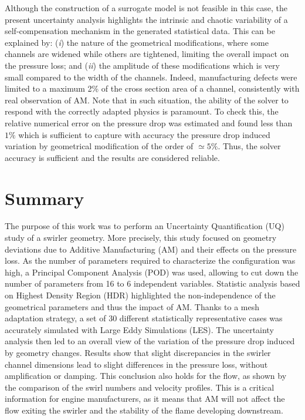 Although the construction of a surrogate model is not feasible in this case, the present uncertainty analysis highlights the intrinsic and chaotic variability of a self-compensation mechanism in the generated statistical data. This can be explained by: (\emph{i}) the nature of the geometrical modifications, where some channels are widened while others are tightened, limiting the overall impact on the pressure loss; and (\emph{ii}) the amplitude of these modifications which is very small compared to the width of the channels. Indeed, manufacturing defects were limited to a maximum 2\% of the cross section area of a channel, consistently with real observation of AM. Note that in such situation, the ability of the solver to respond with the correctly adapted physics is paramount. To check this, the relative numerical error on the pressure drop was estimated and found less than $1\%$ which is sufficient to capture with accuracy the pressure drop induced variation by geometrical modification of the order of $\simeq 5\%$. Thus, the solver accuracy is sufficient and the results are considered reliable.

\section{Summary}
The purpose of this work was to perform an Uncertainty Quantification (UQ) study of a swirler geometry. More precisely, this study focused on geometry deviations due to Additive Manufacturing (AM) and their effects on the pressure loss. As the number of parameters required to characterize the configuration was high, a Principal Component Analysis (POD) was used, allowing to cut down the number of parameters from 16 to 6 independent variables. Statistic analysis based on Highest Density Region (HDR) highlighted the non-independence of the geometrical parameters and thus the impact of AM. Thanks to a mesh adaptation strategy, a set of 30 different statistically representative cases was accurately simulated with Large Eddy Simulations (LES). The uncertainty analysis then led to an overall view of the variation of the pressure drop induced by geometry changes. Results show that slight discrepancies in the swirler channel dimensions lead to slight differences in the pressure loss, without amplification or damping. This conclusion also holds for the flow, as shown by the comparison of the swirl numbers and velocity profiles. This is a critical information for engine manufacturers, as it means that AM will not affect the flow exiting the swirler and the stability of the flame developing downstream.

